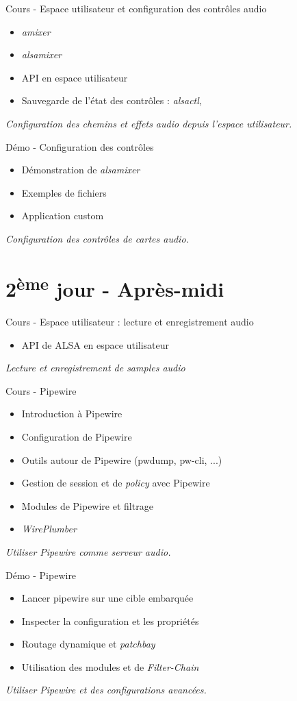 \documentclass[a4paper,12pt,obeyspaces,spaces,hyphens]{article}
\begin{document}
\feagendatwocolumn
{Cours - Espace utilisateur et configuration des contrôles audio}
{
  \begin{itemize}
  \item {\em amixer}
  \item {\em alsamixer}
  \item API en espace utilisateur
  \item Sauvegarde de l'état des contrôles : {\em alsactl}, 
  \end{itemize}
  \vspace{0.5em}
  {\em Configuration des chemins et effets audio depuis l'espace utilisateur.}
}
{Démo - Configuration des contrôles}
{
  \begin{itemize}
  \item Démonstration de {\em alsamixer}
  \item Exemples de fichiers 
  \item Application custom
  \end{itemize}
  \vspace{0.5em}
  {\em Configuration des contrôles de cartes audio.}
}

\section{2\textsuperscript{ème} jour - Après-midi}

\feagendaonecolumn
{Cours - Espace utilisateur : lecture et enregistrement audio}
{
  \begin{itemize}
  \item API de ALSA en espace utilisateur
  \end{itemize}
  \vspace{0.5em}
  {\em Lecture et enregistrement de samples audio}
}

\feagendatwocolumn
{Cours - Pipewire}
{
  \begin{itemize}
  \item Introduction à Pipewire
  \item Configuration de Pipewire
  \item Outils autour de Pipewire (pwdump, pw-cli, ...)
  \item Gestion de session et de {\em policy} avec Pipewire
  \item Modules de Pipewire et filtrage
  \item {\em WirePlumber}
  \end{itemize}
  \vspace{0.5em}
  {\em Utiliser Pipewire comme serveur audio.}
}
{Démo - Pipewire}
{
  \begin{itemize}
  \item Lancer pipewire sur une cible embarquée
  \item Inspecter la configuration et les propriétés
  \item Routage dynamique et {\em patchbay}
  \item Utilisation des modules et de {\em Filter-Chain}
  \end{itemize}
  \vspace{0.5em}
  {\em Utiliser Pipewire et des configurations avancées.}
}
\end{document}
